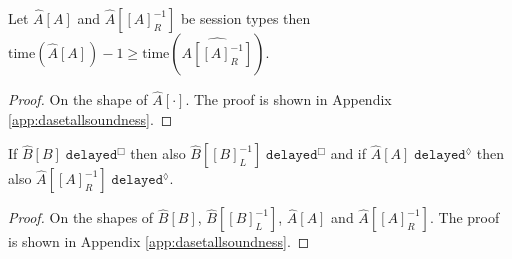 \begin{lemma}
Let $\hat{A}[A]$ and $\hat{A}[[A]^{-1}_R]$ be session types then $\text{time}(\hat{A}[A])-1\geq\text{time}(\hat{A[[A]^{-1}_R]})$.
\begin{proof}
On the shape of $\hat{A}[\cdot]$. The proof is shown in Appendix \ref{app:dasetallsoundness}.
\end{proof}\label{lemma:redprog}
\end{lemma}

\begin{lemma}
If $\hat{B}[B]\;\texttt{delayed}^\Box$ then also $\hat{B}[[B]^{-1}_L]\;\texttt{delayed}^\Box$ and if $\hat{A}[A]\;\texttt{delayed}^\lozenge$ then also $\hat{A}[[A]^{-1}_R]\;\texttt{delayed}^\lozenge$.
\begin{proof}
On the shapes of $\hat{B}[B]$, $\hat{B}[[B]^{-1}_L]$, $\hat{A}[A]$ and $\hat{A}[[A]^{-1}_R]$. The proof is shown in Appendix \ref{app:dasetallsoundness}.
\end{proof}\label{lemma:progdel}
\end{lemma}

